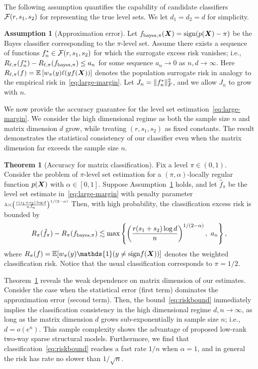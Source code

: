 \documentclass[11pt]{article}
\theoremstyle{definition}
\newtheorem{thm}{Theorem}[section]
\newtheorem{assumption}{Assumption}
\def\sign{\textup{sign}}
\def\bayespif{f_{\textup{bayes},\pi}}
\begin{document}
The following assumption quantifies the capability of candidate classifiers $\mathcal{F}(r,s_1,s_2)$ for representing the true level sets. We let $d_1=d_2=d$ for simplicity. 

\begin{assumption}[Approximation error]\label{ass:main} 
Let $f_{\text{bayes},\pi}(\mX)=\sign(p(\mX) -\pi)$ be the Bayes classifier corresponding to the $\pi$-level set. Assume there exists a sequence of functions $f_n^*\in\mathcal{F}(r,s_1,s_2)$ for which the surrogate excess risk vanishes; i.e., $R_{\ell,\pi}(f^*_n)-R_{\ell,\pi}(\bayespif)\leq a_n$ for some sequence $a_n\to 0$ as $n,d\to \infty$. Here $R_{\ell,\pi}(f)=\mathbb{E}\left[w_\pi(y)\ell(yf(\bm X))\right]$ denotes the population surrogate risk in analogy to the empirical risk in~\eqref{eq:large-margin}. Let $J_n=\lVert f^*_n\rVert_F^2$, and we allow $J_n$ to grow with $n$. 
\end{assumption}

We now provide the accuracy guarantee for the level set estimation~\eqref{eq:large-margin}. We consider the high dimensional regime as both the sample size $n$ and matrix dimension $d$ grow, while treating $(r,s_1,s_2)$ as fixed constants. The result demonstrates the statistical consistency of our classifier even when the matrix dimension far exceeds the sample size $n$. 

\begin{thm}[Accuracy for matrix classification]\label{thm:main} Fix a level $\pi\in(0,1)$. Consider the problem of $\pi$-level set estimation for a $(\pi,\alpha)$-locally regular function $p(\bm X)$ with $\alpha\in[0,1]$. Suppose Assumption~\ref{ass:main} holds, and let $\hat f_\pi$ be the level set estimate in~\eqref{eq:large-margin} with penalty parameter $\scriptstyle\lambda\asymp \left( r( s_1+s_2)\log d \over  nJ_n\right)^{1/(2-\alpha)}$ Then, with high probability, the classification excess risk is bounded by 
\begin{equation}\label{eq:riskbound}
 R_{\pi}( \hat f_\pi)-R_{\pi}(\bayespif) \lesssim \max\left\{\left({r(s_1+s_2)\log d \over n}\right)^{1/(2-\alpha)},\ a_n\right\},
\end{equation}
where $R_{\pi}(f)=\mathbb{E}[w_\pi(y)\mathds{1}(y\neq \sign f(\mX))]$ denotes the weighted classification risk. Notice that the usual classification corresponds to $\pi = 1/2$. 

\end{thm}

Theorem~\ref{thm:main} reveals the weak dependence on matrix dimension of our estimates. Consider the case when the statistical error (first term) dominates the approximation error (second term). Then, the bound~\eqref{eq:riskbound} immediately implies the classification consistency in the high dimensional regime $d,n\to \infty$, as long as the matrix dimension $d$ grows sub-exponentially in sample size $n$; i.e., $d=o(e^n)$. This sample complexity shows the advantage of proposed low-rank two-way sparse structural models. Furthermore, we find that classification~\eqref{eq:riskbound} reaches a fast rate $1/n$ when $\alpha=1$, and in general the risk has rate no slower than $1/\sqrt{n}$. 
\end{document}
